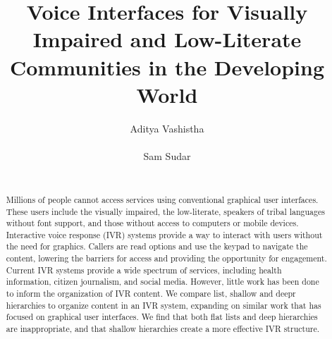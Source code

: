 \documentclass{sigchi}
\begin{document}
\title{Voice Interfaces for Visually Impaired and Low-Literate Communities in the Developing World}

\author{
  \alignauthor Aditya Vashistha\\
    \\
   \alignauthor Sam Sudar\\
    \\}

\maketitle

\begin{abstract}
Millions of people cannot access services using conventional graphical user interfaces. These users include the visually impaired, the low-literate, speakers of tribal languages without font support, and those without access to computers or mobile devices. Interactive voice response (IVR) systems provide a way to interact with users without the need for graphics. Callers are read options and use the keypad to navigate the content, lowering the barriers for access and providing the opportunity for engagement. Current IVR systems provide a wide spectrum of services, including health information, citizen journalism, and social media. However, little work has been done to inform the organization of IVR content. We compare list, shallow and deepr hierarchies to organize content in an IVR system, expanding on similar work that has focused on graphical user interfaces. We find that both flat lists and deep hierarchies are inappropriate, and that shallow hierarchies create a more effective IVR structure.
\end{abstract}

\end{document}
